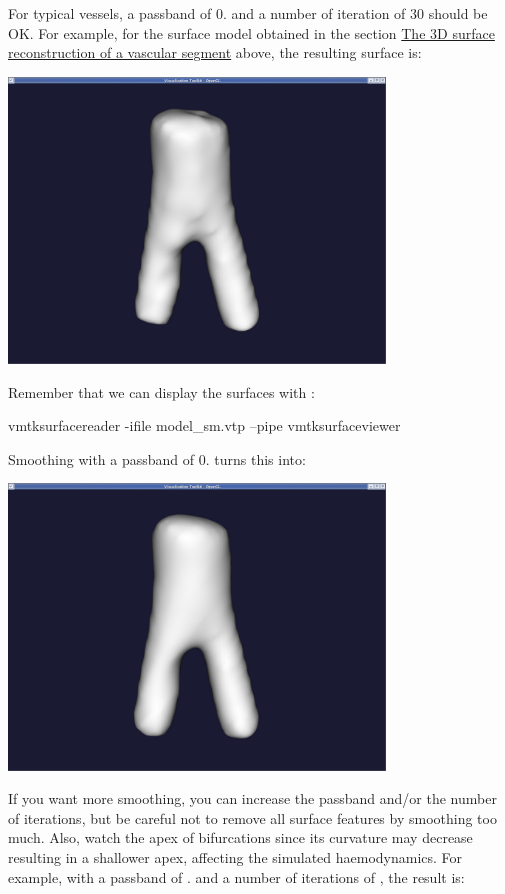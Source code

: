 For typical vessels, a passband of 0. and a number of iteration of 30 should be OK. For example, for the surface model obtained in the section \hyperlink{index_surface}{The 3D surface reconstruction of a vascular segment} above, the resulting surface is\+:

 
\begin{DoxyImageNoCaption}
  \mbox{\includegraphics[width=0.75\textwidth]{smooth0130}}
\end{DoxyImageNoCaption}


Remember that we can display the surfaces with \+: 
\begin{DoxyCode}
vmtksurfacereader -ifile model\_sm.vtp --pipe vmtksurfaceviewer
\end{DoxyCode}


Smoothing with a passband of 0. turns this into\+:

 
\begin{DoxyImageNoCaption}
  \mbox{\includegraphics[width=0.75\textwidth]{smooth00130}}
\end{DoxyImageNoCaption}


If you want more smoothing, you can increase the passband and/or the number of iterations, but be careful not to remove all surface features by smoothing too much. Also, watch the apex of bifurcations since its curvature may decrease resulting in a shallower apex, affecting the simulated haemodynamics. For example, with a passband of {.} and a number of iterations of {}, the result is\+:

